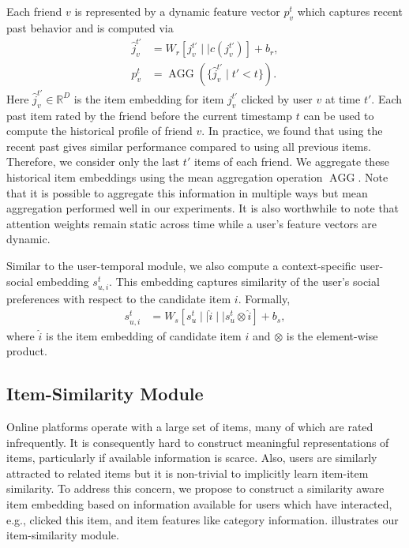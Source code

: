 Each friend $v$ is represented by a dynamic feature vector $p_v^t$ which captures recent past behavior and is computed via
\begin{align}
  \label{eq:useragg}
  \hat{j}_v^{t'} &= W_r [ j_v^{t'} \mid \mid c(j_v^{t'})] + b_r, \\
  p_{v}^{t} &= \operatorname{AGG}(\{\hat{j}_v^{t'} \mid t' < t \}).
\end{align}
Here $\hat{j}_v^{t'} \in \mathbb{R}^D$ is the item embedding for item $j_v^{t'}$ clicked by user $v$ at time $t'$. Each past item rated by the friend before the current timestamp $t$ can be used to compute the historical profile of  friend $v$. In practice, we found that using the recent past gives similar performance compared to using all previous items. Therefore, we consider only the last $t'$ items of each friend. We aggregate these historical item embeddings using the mean aggregation operation $\operatorname{AGG}$. Note that
it is possible to aggregate this information in multiple ways but mean aggregation performed well in our experiments. It is also worthwhile to note that attention weights remain static across time while a user's feature vectors are dynamic.

Similar to the user-temporal module, we also compute a context-specific user-social embedding $s_{u,i}^t$. This embedding captures similarity of the user's social preferences with respect to the candidate item $i$. Formally,
\begin{align}
  s_{u,i}^{t} &=  W_s[s_u^{t} \mid \mid \hat{i} \mid \mid s_u^{t} \otimes \hat{i}] + b_s,
\end{align}
where $\hat{i}$ is the item embedding of candidate item $i$ and $\otimes$ is the element-wise product.

\subsection{Item-Similarity Module}
Online platforms operate with a large set of items, many of which are rated infrequently. It is consequently hard to construct meaningful representations of items, particularly if available information is scarce. Also, users are similarly attracted to related items but it is non-trivial  to implicitly learn item-item similarity.
To address this concern, we propose to construct a similarity aware item embedding based on information available for users which have interacted, e.g., clicked this item, and item features like category information.   illustrates our item-similarity module.

